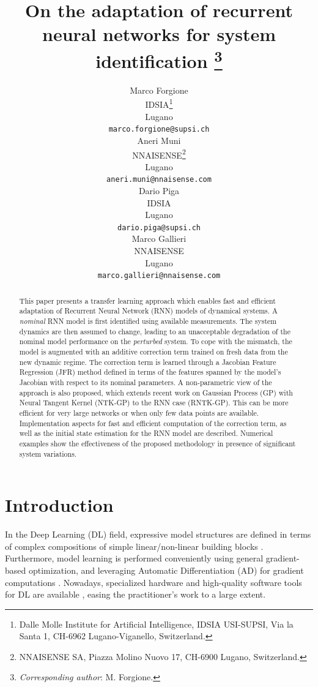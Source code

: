 \documentclass{article}
\title{On the adaptation of recurrent neural networks for system identification
\thanks{\textit{Corresponding author}: 
M. Forgione.} 
}
\author{
  Marco Forgione \\
  IDSIA\thanks{Dalle Molle Institute for Artificial Intelligence, IDSIA USI-SUPSI, Via la Santa 1, CH-6962 Lugano-Viganello, Switzerland.} \\
  Lugano\\
  \texttt{marco.forgione@supsi.ch} \\
   \And
  Aneri Muni \\
  NNAISENSE\thanks{NNAISENSE SA, Piazza Molino Nuovo 17, CH-6900 Lugano, Switzerland.} \\
  Lugano\\
  \texttt{aneri.muni@nnaisense.com} \\
  \And
  Dario Piga \\
  IDSIA \\
  Lugano\\
  \texttt{dario.piga@supsi.ch} \\
  \And
  Marco Gallieri \\
  NNAISENSE \\
  Lugano\\
  \texttt{marco.gallieri@nnaisense.com} \\
}
\begin{document}
\maketitle


\begin{abstract}
This paper presents a transfer learning approach which enables fast and efficient adaptation of Recurrent Neural Network (RNN) models of dynamical systems. A \emph{nominal} RNN model is first identified using available measurements. The system dynamics are then assumed to change, leading to an unacceptable degradation of the nominal model performance  on the \emph{perturbed} system. To cope with the  mismatch, the model is augmented  with an additive correction term trained on fresh data from the new dynamic regime. The correction term is learned through a Jacobian Feature Regression (JFR) method defined in terms of the features spanned by the model's Jacobian with respect to its nominal parameters.
A non-parametric view of the approach is also proposed, which extends recent work on Gaussian Process (GP) with Neural Tangent Kernel (NTK-GP) to the RNN case (RNTK-GP). This can be more efficient for very large networks or when only few data points are available. Implementation aspects for fast and efficient computation of the correction term, as well as the initial state estimation for the RNN model are described. Numerical examples show the effectiveness of the proposed methodology in presence of significant system variations. 
\end{abstract}




\section{Introduction}
\label{sec:intro}
In the Deep Learning (DL) field, expressive model structures are defined in terms of 
complex compositions of simple linear/non-linear building blocks \cite{schmidhuber2015deep}. Furthermore, model learning is performed conveniently using general gradient-based optimization, and leveraging  Automatic Differentiation (AD) for gradient computations \cite{baydin2017automatic}. Nowadays, specialized hardware and 
high-quality software tools for DL are available \cite{paszke2017automatic}, easing the practitioner's work to a large extent.
\end{document}
